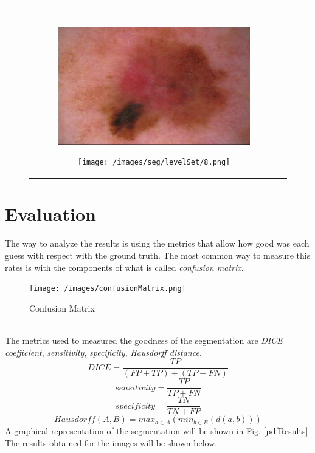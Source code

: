 \documentclass[a4paper, 10pt, conference]{ieeeconf}        %
\begin{document}
\begin{figure}[ht!]
\begin{tabular}{c c}
\begin{subfigure}{0.2\textwidth}
   \end{subfigure}\\
  \begin{subfigure}{0.2\textwidth}
   \includegraphics[scale=0.15]{original08.JPG}\caption{}
   \end{subfigure}
   \begin{subfigure}{0.2\textwidth}
   \texttt{[image: /images/seg/levelSet/8.png]}
   \caption{}
   \end{subfigure}\\    
  \end{tabular}
  \end{figure}
\clearpage
\section{Evaluation}
The way to analyze the results is using the metrics that allow how good was each guess with respect with the ground truth.
The most common way to measure this rates is with the components of what is called \textit{confusion matrix}.
\begin{figure}[ht!]
\centering
 \texttt{[image: /images/confusionMatrix.png]}\caption{Confusion Matrix}
\end{figure} \\
The metrics used to measured the goodness of the segmentation are \textit{DICE coefficient}, \textit{sensitivity}, \textit{specificity}, \textit{Hausdorff distance}.
\begin{equation}
DICE = \frac{TP}{(FP + TP)+(TP + FN)}
\end{equation}
\begin{equation}
sensitivity = \frac{TP}{TP + FN}
\end{equation}
\begin{equation}
specificity = \frac{TN}{TN + FP}
\end{equation}
\begin{equation}
Hausdorff(A,B) = max_{a\in A}(min_{b\in B}( d(a,b) ))
\end{equation}
A graphical representation of the segmentation will be shown in Fig. \ref{pdfResults}
The results obtained for the images will be shown below.\\
\end{document}
